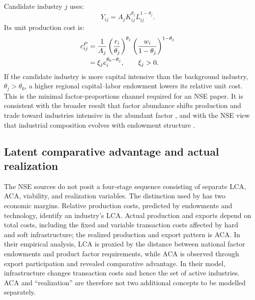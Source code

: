 \documentclass[11pt]{article}
\theoremstyle{definition}
\theoremstyle{remark}
\begin{document}
Candidate industry \(j\) uses:
\begin{equation}
 Y_{ij}=A_jK_{ij}^{\theta_j}L_{ij}^{1-\theta_j}.
 \label{eq:candidate_technology}
\end{equation}
Its unit production cost is:
\begin{align}
 c^P_{ij}
 &=
 \frac{1}{A_j}
 \left(\frac{r_i}{\theta_j}\right)^{\theta_j}
 \left(\frac{w_i}{1-\theta_j}\right)^{1-\theta_j}
 \notag\\
 &=\xi_j e_i^{\theta_0-\theta_j},
 \qquad \xi_j>0.
 \label{eq:unit_production_cost}
\end{align}
If the candidate industry is more capital intensive than the background
industry, \(\theta_j>\theta_0\), a higher regional capital--labor endowment
lowers its relative unit cost.  This is the minimal factor-proportions channel
required for an NSE paper.  It is consistent with the broader result that
factor abundance shifts production and trade toward industries intensive in
the abundant factor \citep{Romalis2004}, and with the NSE view that industrial
composition evolves with endowment structure \citep{JuLinWang2015}.

\subsection{Latent comparative advantage and actual realization}

The NSE sources do not posit a four-stage sequence consisting of separate LCA,
ACA, viability, and realization variables.  The distinction used by
\citet{LinWang2023} has two economic margins.  Relative production costs,
predicted by endowments and technology, identify an industry's LCA.  Actual
production and exports depend on total costs, including the fixed and variable
transaction costs affected by hard and soft infrastructure; the realized
production and export pattern is ACA.  In their empirical analysis, LCA is
proxied by the distance between national factor endowments and product factor
requirements, while ACA is observed through export participation and revealed
comparative advantage.  In their model, infrastructure changes transaction
costs and hence the set of active industries.  ACA and ``realization'' are
therefore not two additional concepts to be modelled separately.
\end{document}

